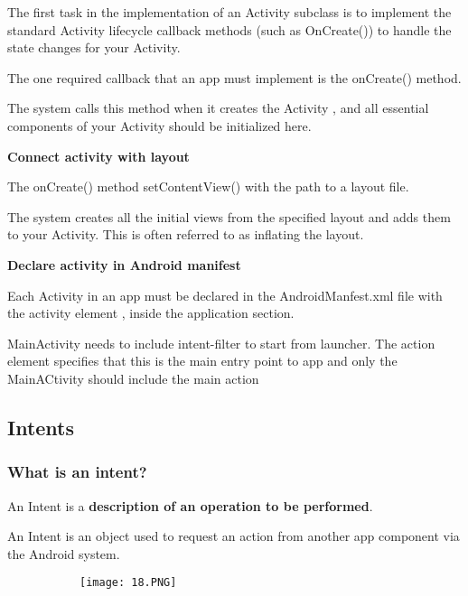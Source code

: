 \documentclass{article}
\begin{document}
The first task in the implementation of an Activity subclass is to implement the standard Activity lifecycle callback methods (such as OnCreate()) to handle the state changes for your Activity.

The one required callback that an app must implement is the onCreate() method.

The system calls this method when it creates the Activity , and all essential components of your Activity should be initialized here.

\vspace{10mm}

\textbf{Connect activity with layout}

The onCreate() method setContentView() with the path to a layout file.

The system creates all the initial views from the specified layout and adds them to your Activity. This is often referred to as inflating the layout.

\vspace{10mm}

\textbf{Declare activity in Android manifest}

Each Activity in an app must be declared in the AndroidManfest.xml file with the activity element , inside the application section.

MainActivity needs to include intent-filter to start from launcher. The action element specifies that this is the main entry point to app and only the MainACtivity should include the main action

\subsection{Intents}

\subsubsection{What is an intent?}

An Intent is a \textbf{description of an operation to be performed}.

An Intent is an object used to request an action from another app component via the Android system.

    \begin{figure}[ht!]
  \centering
  \begin{subfigure}[b]{0.5\linewidth}
    \texttt{[image: 18.PNG]}
  \end{subfigure}
  \end{figure}
\end{document}
